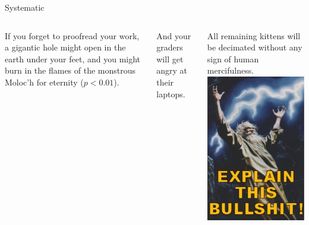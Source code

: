 \documentclass[t]{beamer}
\begin{document}
	
	\begin{frame}[t]{Systematic }
		\begin{columns}[T]
			If you forget to proofread your work, a gigantic hole might open in the earth under your feet, and you might burn in the flames of the monstrous Moloc'h for eternity ($p < 0.01$).\vspace{1em}
			
			And your graders will get angry at their laptops.\vspace{1em}
			
			All remaining kittens will be decimated without any sign of human mercifulness.
			\includegraphics[height=.66\paperheight]{explain.jpg}
		\end{columns}
	\end{frame}
	
	
\end{document}
